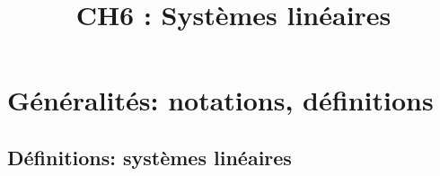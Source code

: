 \documentclass[a4paper, 11pt]{article}
\begin{document}
\tableofcontents
\title{CH6 : Systèmes linéaires }



\section{G\'en\'eralit\'es: notations, d\'efinitions}
\subsection{D\'efinitions: syst\`{e}mes lin\'eaires}

\end{document}
